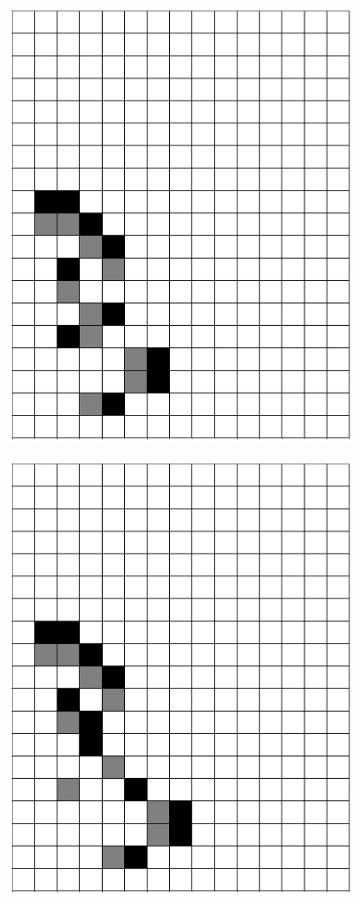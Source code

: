 \documentclass[12pt]{article}
\numberwithin{figure}{section} %
\begin{document}
\begin{figure}[H]
\begin{subfigure}{0.3\textwidth}
     \includegraphics[width=\linewidth]{Section4/29.1}
     \subcaption{}
   \end{subfigure}
        \begin{subfigure}{0.3\textwidth}
     \centering
     \includegraphics[width=\linewidth]{Section4/29.2}

\end{subfigure}
\end{figure}
\end{document}
